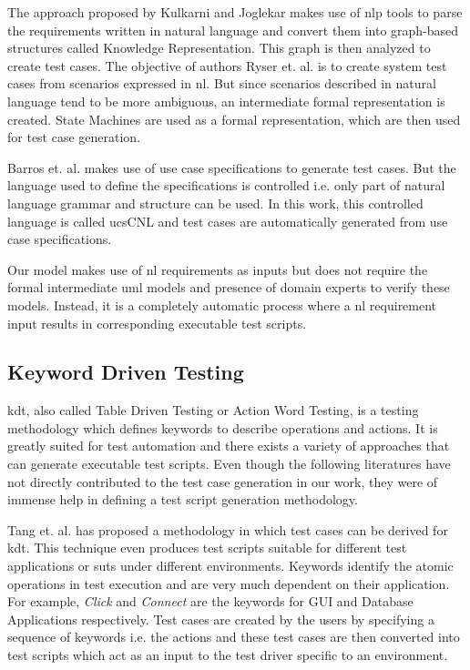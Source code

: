 The approach proposed by Kulkarni and Joglekar \cite{kulkarni2014generating} makes use of \gls{nlp} tools to parse the requirements written in natural language and convert them into graph-based structures called Knowledge Representation. This graph is then analyzed to create test cases. The objective of authors Ryser et. al. \cite{ryser1999practical} is to create system test cases from scenarios expressed in \gls{nl}. But since scenarios described in natural language tend to be more ambiguous, an intermediate formal representation is created. State Machines are used as a formal representation, which are then used for test case generation.

Barros et. al. \cite{barros2011ucscnl} makes use of use case specifications to generate test cases. But the language used to define the specifications is controlled i.e. only part of natural language grammar and structure can be used. In this work, this controlled language is called ucsCNL and test cases are automatically generated from use case specifications.

Our model makes use of \gls{nl} requirements as inputs but does not require the formal intermediate \gls{uml} models and presence of domain experts to verify these models. Instead, it is a completely automatic process where a \gls{nl} requirement input results in corresponding executable test scripts.  

\subsection{Keyword Driven Testing}
\gls{kdt}, also called Table Driven Testing or Action Word Testing, is a testing methodology which defines keywords to describe operations and actions. It is greatly suited for test automation and there exists a variety of approaches that can generate executable test scripts. Even though the following literatures have not directly contributed to the test case generation in our work, they were of immense help in defining a test script generation methodology.

Tang et. al. \cite{tang2008towards} has proposed a methodology in which test cases can be derived for \gls{kdt}. This technique even produces test scripts suitable for different test applications or \glspl{sut} under different environments. Keywords identify the atomic operations in test execution and are very much dependent on their application. For example, \textit{Click} and \textit{Connect} are the keywords for GUI and Database Applications respectively. Test cases are created by the users by specifying a sequence of keywords i.e. the actions and these test cases are then converted into test scripts which act as an input to the test driver specific to an environment.

